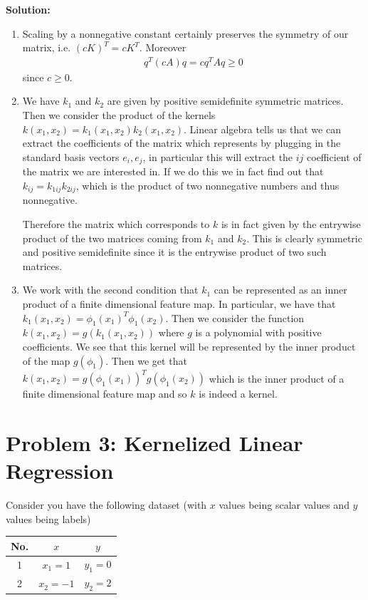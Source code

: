\documentclass[11pt]{article}
\begin{document}
\textbf{Solution:}
\begin{enumerate}
    \item Scaling by a nonnegative constant certainly preserves the symmetry of our matrix, i.e. $(cK)^T = cK^T$. Moreover 
    \begin{align*}
        q^T(cA)q = cq^TAq \geq 0
    \end{align*} since $c\geq 0$. 
    \item We have $k_1$ and $k_2$ are given by positive semidefinite symmetric matrices.
    Then we consider the product of the kernels $k(x_1,x_2) = k_1(x_1,x_2)k_2(x_1,x_2)$. Linear algebra tells us that we can extract the coefficients
    of the matrix which represents by plugging in the standard basis vectors $e_i,e_j$,
    in particular this will extract the $ij$ coefficient of the matrix we are interested in. If we do this
    we in fact find out that $k_{ij} = k_{1ij}k_{2ij}$, which is the product of two nonnegative numbers and thus nonnegative.

    Therefore the matrix which corresponds to $k$ is in fact given by the entrywise product of the two matrices coming
    from $k_1$ and $k_2$. This is clearly symmetric and positive semidefinite since it is the entrywise product of two
    such matrices.
    \item We work with the second condition that $k_1$ can be represented as an inner
    product of a finite dimensional feature map. In particular, we have that $k_1(x_1,x_2) = \phi_1(x_1)^T\phi_1(x_2)$.
    Then we consider the function $k(x_1,x_2) = g(k_1(x_1,x_2))$ where $g$ is a polynomial with positive coefficients.
    We see that this kernel will be represented by the inner product of the map $g(\phi_1)$.
    Then we get that $k(x_1,x_2) = g(\phi_1(x_1))^Tg(\phi_1(x_2))$ which is the inner product of a finite dimensional feature map
    and so $k$ is indeed a kernel.
\end{enumerate}
\pagebreak

\section*{Problem 3: Kernelized Linear Regression}

Consider you have the following dataset (with $x$ values being scalar values and $y$ values being labels)
\begin{table}[h]
	\centering
	\begin{tabular}{|c|c|c|}
		\hline
		No.& $x$ & $y$ \\
		\hline
		1 & $x_1=1$ & $y_1=0$ \\
        \hline
		2 & $x_2=-1$ & $y_2=2$ \\
		\hline
	\end{tabular}
\end{table}
\newline
\end{document}
